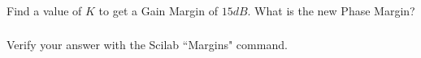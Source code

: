 \documentclass{article}	%
\begin{document}
%
%
%


\subsubsection{}  Find a value of $K$ to get a Gain Margin of $15dB$.  What is the new Phase Margin?

%
%
%
%
%
\subsubsection{}    Verify your answer with the Scilab ``Margins" command.


%
%
%
%
%
%
%
%
%
%
%
%
%
%
%
\newpage
\end{document}
